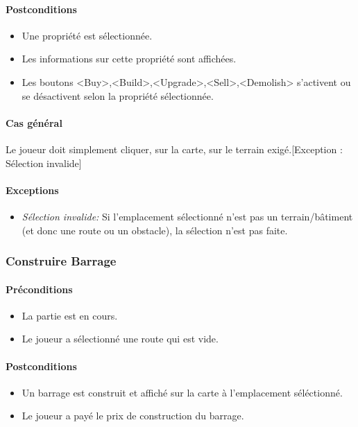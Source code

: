 \documentclass[a4paper,11pt]{report}
\begin{document}
\paragraph{Postconditions}
\begin{itemize}
	\item Une propriété est sélectionnée.
	\item Les informations sur cette propriété sont affichées.
	\item Les boutons <Buy>,<Build>,<Upgrade>,<Sell>,<Demolish> s'activent ou se désactivent selon la propriété sélectionnée.
\end{itemize}
\paragraph{Cas général}
Le joueur doit simplement cliquer, sur la carte, sur le terrain exigé.[Exception : Sélection invalide]
\paragraph{Exceptions}
\begin{itemize}
	\item \textit{Sélection invalide:} Si l'emplacement sélectionné n'est pas un terrain/bâtiment (et donc une route ou un obstacle), la sélection n'est pas faite.
\end{itemize}

\subsubsection{Construire Barrage}
\paragraph{Préconditions}
\begin{itemize}
	\item La partie est en cours.
	\item Le joueur a sélectionné une route qui est vide.
\end{itemize}
\paragraph{Postconditions}
\begin{itemize}
	\item Un barrage est construit et affiché sur la carte à l'emplacement séléctionné.
	\item Le joueur a payé le prix de construction du barrage.
\end{itemize}
\end{document}
